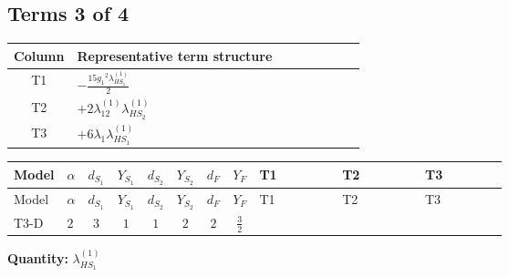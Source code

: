 \documentclass[8pt]{article}
\begin{document}
\begin{landscape}
\subsection*{Terms 3 of 4}
\begin{center}
\begin{tabular}{@{}c >{\raggedright\arraybackslash}p{0.82\linewidth}@{}}
\toprule
Column & Representative term structure \\
\midrule
T1 & \(\displaystyle -\frac{15 {g_1}^2 {\lambda_{HS_1}^{(1)}}}{2}\) \\
\midrule
T2 & \(\displaystyle +2 {\lambda_{12}^{(1)}} {\lambda_{HS_2}^{(1)}}\) \\
\midrule
T3 & \(\displaystyle +6 {\lambda_1} {\lambda_{HS_1}^{(1)}}\) \\
\midrule
\bottomrule
\end{tabular}
\end{center}
\smallskip
\tiny
\begin{longtable}{@{}llcccccc >{\raggedright\arraybackslash}p{0.21\linewidth} >{\raggedright\arraybackslash}p{0.21\linewidth} >{\raggedright\arraybackslash}p{0.21\linewidth}@{}}
\toprule
Model & $\alpha$ & $d_{S_1}$ & $Y_{S_1}$ & $d_{S_2}$ & $Y_{S_2}$ & $d_F$ & $Y_F$ & T1 & T2 & T3 \\
\midrule
\endfirsthead
\toprule
Model & $\alpha$ & $d_{S_1}$ & $Y_{S_1}$ & $d_{S_2}$ & $Y_{S_2}$ & $d_F$ & $Y_F$ & T1 & T2 & T3 \\
\midrule
\endhead
T3-D & $2$ & $3$ & $1$ & $1$ & $2$ & $2$ & $\frac{3}{2}$ & \scriptsize\adjustbox{max width=\linewidth}{$\begin{gathered} -\frac{15 {g_1}^2 {\lambda_{HS_1}^{(1)}}}{2}\end{gathered}$} & \scriptsize\adjustbox{max width=\linewidth}{$\begin{gathered} +2 {\lambda_{12}^{(1)}} {\lambda_{HS_2}^{(1)}}\end{gathered}$} & \scriptsize\adjustbox{max width=\linewidth}{$\begin{gathered} +6 {\lambda_1} {\lambda_{HS_1}^{(1)}}\end{gathered}$} \\
\midrule
\bottomrule
\end{longtable}
\clearpage
\noindent\textbf{Quantity: }$\lambda_{HS_1}^{(1)}$\par\smallskip

\end{landscape}
\end{document}
